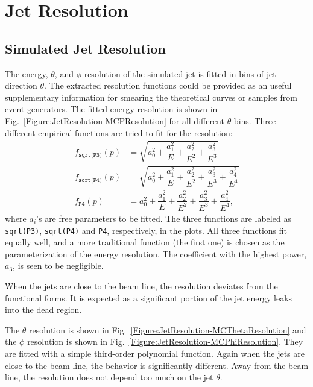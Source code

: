 \section{Jet Resolution}\label{Section:JetResolution}

\subsection{Simulated Jet Resolution}

The energy, $\theta$, and $\phi$ resolution of the simulated jet is fitted in bins of jet direction $\theta$. The extracted resolution functions could be provided as an useful supplementary information for smearing the theoretical curves or samples from event generators.
 The fitted energy resolution is shown in Fig.~\ref{Figure:JetResolution-MCPResolution} for all different $\theta$ bins.  Three different empirical functions are tried to fit for the resolution:
%
\begin{align}
    f_\texttt{sqrt(P3)}(p) &= \sqrt{a_0^2 + \dfrac{a_1^2}{E} + \dfrac{a_2^2}{E^2} + \dfrac{a_3^2}{E^3}}\\
    f_\texttt{sqrt(P4)}(p) &= \sqrt{a_0^2 + \dfrac{a_1^2}{E} + \dfrac{a_2^2}{E^2} + \dfrac{a_3^2}{E^3} + \dfrac{a_4^2}{E^4}}\\
    f_\texttt{P4}(p) &= a_0^2 + \dfrac{a_1^2}{E} + \dfrac{a_2^2}{E^2} + \dfrac{a_3^2}{E^3} + \dfrac{a_4^2}{E^4},
\end{align}
%
where $a_i$'s are free parameters to be fitted.  The three functions are labeled as \texttt{sqrt(P3)}, \texttt{sqrt(P4)} and \texttt{P4}, respectively, in the plots.  All three functions fit equally well, and a more traditional function (the first one) is chosen as the parameterization of the energy resolution.  The coefficient with the highest power, $a_3$, is seen to be negligible.

When the jets are close to the beam line, the resolution deviates from the functional forms.  It is expected as a significant portion of the jet energy leaks into the dead region.

The $\theta$ resolution is shown in Fig.~\ref{Figure:JetResolution-MCThetaResolution} and the $\phi$ resolution is shown in Fig.~\ref{Figure:JetResolution-MCPhiResolution}.  They are fitted with a simple third-order polynomial function.  Again when the jets are close to the beam line, the behavior is significantly different.  Away from the beam line, the resolution does not depend too much on the jet $\theta$.


